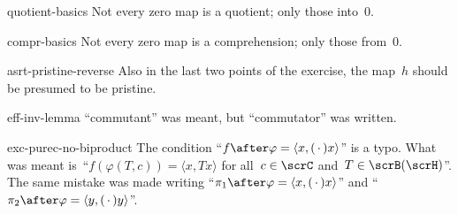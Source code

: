 \begin{erratum}{quotient-basics}%
Not every zero map is a quotient; only those into~$0$.
\end{erratum}
\begin{erratum}{compr-basics}%
Not every zero map is a comprehension; only those from~$0$.
\end{erratum}
\begin{erratum}{asrt-pristine-reverse}%
Also in the last two points of the exercise,
    the map~$h$ should be presumed to be pristine.
\end{erratum}
\begin{erratum}{eff-inv-lemma}%
``commutant'' was meant, but ``commutator'' was written.
\end{erratum}
\begin{erratum}{exc-purec-no-biproduct}%
The condition
    ``$f \after \varphi = \langle x, (\,\cdot\,) x\rangle$''
        is a typo.
        What was meant is~``$f (\varphi(T, c)) = \langle x, T x\rangle $
        for all~$c \in \scrC$
        and~$T \in \scrB(\scrH)$''.
The same mistake was made writing
    ``$\pi_1 \after \varphi = \langle x, (\,\cdot\,) x\rangle$'' and
    ``$\pi_2 \after \varphi = \langle y, (\,\cdot\,) y\rangle$''.
\end{erratum}

